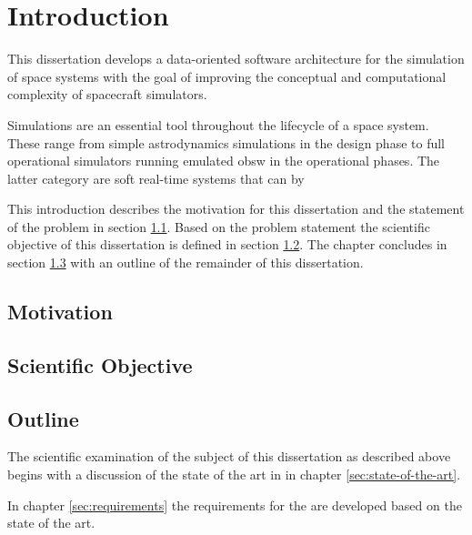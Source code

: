 \chapter{Introduction}
\label{sec:introduction}
This dissertation develops a data-oriented software architecture for the simulation of space systems with the goal of improving the conceptual and computational complexity of spacecraft simulators.

Simulations are an essential tool throughout the lifecycle of a space system.
These range from simple astrodynamics simulations in the design phase to full operational simulators running emulated \ac{obsw} in the operational phases.
The latter category are soft real-time systems that can by 


This introduction describes the motivation for this dissertation and the statement of the problem in section \ref{sec:motivation}.
Based on the problem statement the scientific objective of this dissertation is defined in section \ref{sec:scientific-objective}.
The chapter concludes in section \ref{sec:outline} with an outline of the remainder of this dissertation.

\section{Motivation}
\label{sec:motivation}

\section{Scientific Objective}
\label{sec:scientific-objective}

\section{Outline}
\label{sec:outline}
The scientific examination of the subject of this dissertation as described above begins with a discussion of the state of the art in  in chapter \ref{sec:state-of-the-art}.

In chapter \ref{sec:requirements} the requirements for the \topic are developed based on the state of the art.


